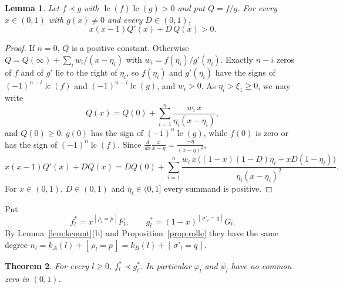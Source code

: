 \documentclass[11pt]{amsart}
\newtheorem{theorem}{Theorem}[section]
\newtheorem{lemma}[theorem]{Lemma}
\theoremstyle{definition}
\theoremstyle{remark}
\numberwithin{equation}{section}
\newcommand{\ind}[1]{[\,#1\,]}
\DeclareMathOperator{\lc}{lc}
\begin{document}
\begin{lemma}\label{lem:ratio}
Let $f\prec g$ with $\lc(f)\lc(g)>0$ and put $Q=f/g$. For every $x\in(0,1)$ with $g(x)\ne0$ and every $D\in(0,1)$,
\[
x(x-1)Q'(x)+D\,Q(x)>0 .
\]
\end{lemma}

\begin{proof}
If $n=0$, $Q$ is a positive constant. Otherwise $Q=Q(\infty)+\sum_iw_i/(x-\eta_i)$ with $w_i=f(\eta_i)/g'(\eta_i)$. Exactly $n-i$ zeros of $f$ and of $g'$ lie to the right of $\eta_i$, so $f(\eta_i)$ and $g'(\eta_i)$ have the signs of $(-1)^{n-i}\lc(f)$ and $(-1)^{n-i}\lc(g)$, and $w_i>0$. As $\eta_i>\xi_1\ge0$, we may write
\[
Q(x)=Q(0)+\sum_{i=1}^n\frac{w_i\,x}{\eta_i(x-\eta_i)},
\]
and $Q(0)\ge0$: $g(0)$ has the sign of $(-1)^n\lc(g)$, while $f(0)$ is zero or has the sign of $(-1)^n\lc(f)$. Since $\frac{d}{dx}\frac{x}{x-\eta}=\frac{-\eta}{(x-\eta)^2}$,
\[
x(x-1)Q'(x)+DQ(x)=DQ(0)+\sum_{i=1}^n\frac{w_i\,x\,\bigl((1-x)(1-D)\eta_i+xD(1-\eta_i)\bigr)}{\eta_i(x-\eta_i)^2}.
\]
For $x\in(0,1)$, $D\in(0,1)$ and $\eta_i\in(0,1]$ every summand is positive.
\end{proof}

Put
\[
f^*_l=x^{\ind{\rho_l=p}}F_l,\qquad g^*_l=(1-x)^{\ind{\sigma'_l=q}}G_l .
\]
By Lemma~\ref{lem:kcount}(b) and Proposition~\ref{prop:rolle} they have the same degree $n_l=k_A(l)+\ind{\rho_l=p}=k_B(l)+\ind{\sigma'_l=q}$.

\begin{theorem}\label{thm:interlace}
For every $l\ge0$, $f^*_l\prec g^*_l$. In particular $\varphi_l$ and $\psi_l$ have no common zero in $(0,1)$.
\end{theorem}
\end{document}
